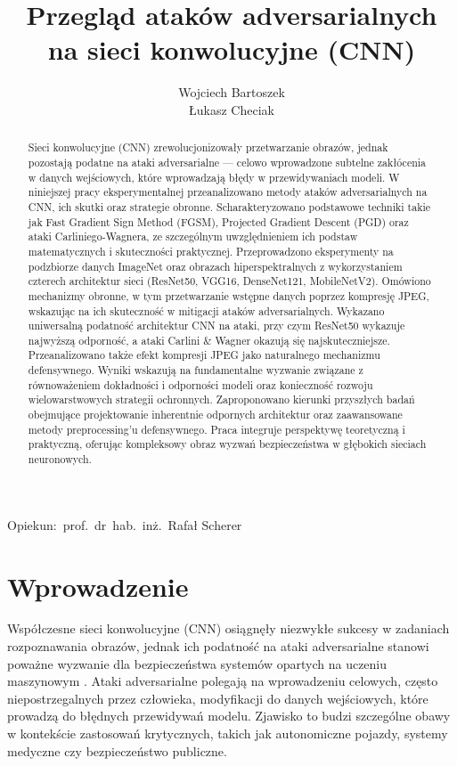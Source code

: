 \documentclass[12pt]{article}
\title{Przegląd ataków adversarialnych na sieci konwolucyjne (CNN)}
\author{
    Wojciech Bartoszek \\
    Łukasz Checiak
}
\date{}
\begin{document}
\maketitle

\begin{center}
    Opiekun:\ prof.\ dr\ hab.\ inż.\ Rafał Scherer
\end{center}

\begin{abstract}
    Sieci konwolucyjne (CNN) zrewolucjonizowały przetwarzanie obrazów, jednak pozostają podatne na ataki adversarialne --- celowo wprowadzone subtelne zakłócenia w danych wejściowych, które wprowadzają błędy w przewidywaniach modeli. W niniejszej pracy eksperymentalnej przeanalizowano metody ataków adversarialnych na CNN, ich skutki oraz strategie obronne. Scharakteryzowano podstawowe techniki takie jak Fast Gradient Sign Method (FGSM), Projected Gradient Descent (PGD) oraz ataki Carliniego-Wagnera, ze szczególnym uwzględnieniem ich podstaw matematycznych i skuteczności praktycznej. Przeprowadzono eksperymenty na podzbiorze danych ImageNet oraz obrazach hiperspektralnych z wykorzystaniem czterech architektur sieci (ResNet50, VGG16, DenseNet121, MobileNetV2). Omówiono mechanizmy obronne, w tym przetwarzanie wstępne danych poprzez kompresję JPEG, wskazując na ich skuteczność w mitigacji ataków adversarialnych. Wykazano uniwersalną podatność architektur CNN na ataki, przy czym ResNet50 wykazuje najwyższą odporność, a ataki Carlini \& Wagner okazują się najskuteczniejsze. Przeanalizowano także efekt kompresji JPEG jako naturalnego mechanizmu defensywnego. Wyniki wskazują na fundamentalne wyzwanie związane z równoważeniem dokładności i odporności modeli oraz konieczność rozwoju wielowarstwowych strategii ochronnych. Zaproponowano kierunki przyszłych badań obejmujące projektowanie inherentnie odpornych architektur oraz zaawansowane metody preprocessing'u defensywnego. Praca integruje perspektywę teoretyczną i praktyczną, oferując kompleksowy obraz wyzwań bezpieczeństwa w głębokich sieciach neuronowych.
\end{abstract}


\section{Wprowadzenie}

Współczesne sieci konwolucyjne (CNN) osiągnęły niezwykłe sukcesy w zadaniach rozpoznawania obrazów, jednak ich podatność na ataki adversarialne stanowi poważne wyzwanie dla bezpieczeństwa systemów opartych na uczeniu maszynowym \cite{szegedy2013intriguing}. Ataki adversarialne polegają na wprowadzeniu celowych, często niepostrzegalnych przez człowieka, modyfikacji do danych wejściowych, które prowadzą do błędnych przewidywań modelu. Zjawisko to budzi szczególne obawy w kontekście zastosowań krytycznych, takich jak autonomiczne pojazdy, systemy medyczne czy bezpieczeństwo publiczne.
\end{document}
